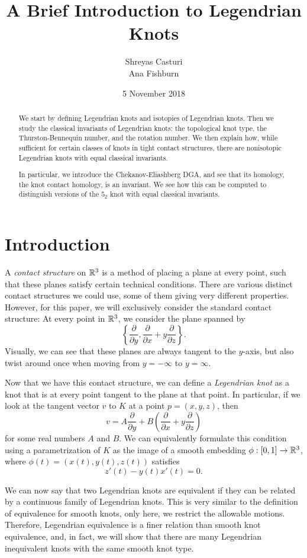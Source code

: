 \documentclass{article}
\title{A Brief Introduction to Legendrian Knots}
\author{Shreyas Casturi\\Ana Fishburn}
\date{5 November 2018}
\begin{document}
\maketitle

\begin{abstract}
We start by defining Legendrian knots and isotopies of Legendrian knots.
Then we study the classical invariants of Legendrian knots:
the topological knot type, the Thurston-Bennequin number, and the rotation number.
We then explain how, while sufficient for certain classes of knots in tight
contact structures, there are nonisotopic Legendrian knots with equal
classical invariants.

In particular, we introduce the Chekanov-Eliashberg DGA, and see that its
homology, the knot contact homology, is an invariant. We see how this
can be computed to distinguish versions of the $5_2$ knot with equal classical
invariants.
\end{abstract}

\section{Introduction}
A {\it contact structure} on $\mathbb{R}^3$ is a method of placing a plane at every point,
such that these planes satisfy certain technical conditions.
There are various distinct contact structures we could use, some of them giving
very different properties.
However, for this paper, we will exclusively consider the standard contact structure:
At every point in $\mathbb{R}^3$, we consider the plane spanned by
\[\left\{\frac{\partial}{\partial y},\frac{\partial}{\partial x} + y\frac{\partial}{\partial z}\right\}.\]
Visually, we can see that these planes are always tangent to the $y$-axis, but also
twist around once when moving from $y = -\infty$ to $y = \infty$.

Now that we have this contact structure, we can define a {\it Legendrian knot}
as a knot that is at every point tangent to the plane at that point.
In particular, if we look at the tangent vector $v$ to $K$ at a point $p = (x,y,z)$,
then
\[ v = A\frac{\partial}{\partial y} + B\left(\frac{\partial}{\partial x} +y\frac{\partial}{\partial z}\right)\]
for some real numbers $A$ and $B$.
We can equivalently formulate this condition using a parametrization of $K$ as
the image of a smooth embedding $\phi : [0,1] \to \mathbb{R}^3$, where $\phi(t) = (x(t),y(t),z(t))$ satisfies
\[ z'(t)-y(t)x'(t) = 0.\]

We can now say that two Legendrian knots are equivalent if they can be related by a continuous
family of Legendrian knots. This is very similar to the definition of equivalence
for smooth knots, only here, we restrict the allowable motions.
Therefore, Legendrian equivalence is a finer relation than smooth knot equivalence,
and, in fact, we will show that there are many Legendrian inequivalent knots
with the same smooth knot type.
\end{document}

